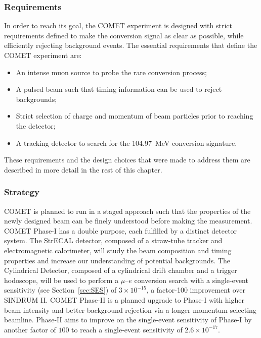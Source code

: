 \subsubsection{Requirements}
In order to reach its goal, the COMET experiment is designed with strict
requirements defined to make the conversion signal as clear as possible, while
efficiently rejecting background events. The essential requirements that define
the COMET experiment are:
\begin{itemize}
    \item An intense muon source to probe the rare conversion process;
    \item A pulsed beam such that timing information can be used to reject
    backgrounds;
    \item Strict selection of charge and momentum of beam particles prior to
    reaching the detector;
    \item A tracking detector to search for the \SI{104.97}{\MeV} conversion
    signature.
\end{itemize}
These requirements and the design choices that were made to address them are
described in more detail in the rest of this chapter.

\subsubsection{Strategy}
COMET is planned to run in a staged approach such that the properties of the
newly designed beam can be finely understood before making the measurement.
COMET Phase-I has a double purpose, each fulfilled by a distinct detector
system. The StrECAL detector, composed of a straw-tube tracker and
electromagnetic calorimeter, will study the beam composition and timing
properties and increase our understanding of potential backgrounds. The
Cylindrical Detector, composed of a cylindrical drift chamber and a trigger
hodoscope, will be used to perform a $\mu$--$e$ conversion search with a
single-event sensitivity (see Section~\ref{sec:SES}) of $3\times 10^{-15}$, a
factor-100 improvement over SINDRUM II. COMET Phase-II is a planned upgrade to
Phase-I with higher beam intensity and better background rejection via a longer
momentum-selecting beamline. Phase-II aims to improve on the single-event
sensitivity of Phase-I by another factor of $100$ to reach a single-event
sensitivity of $2.6\times 10^{-17}$.

